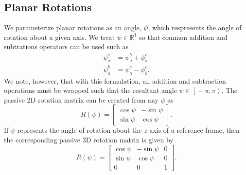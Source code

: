 
\subsection{Planar Rotations}

We parameterize planar rotations as an angle, $\psi$, which respresents
the angle of rotation about a given axis.
We treat $\psi \in \mathbb{R}^1$ so that common addition and subtrations
operators can be used such as
\begin{align}
  \psi_a^c &= \psi_a^b + \psi_b^c \\
  \psi_a^b &= \psi_a^c - \psi_b^c.
\end{align}
We note, however, that with this formulation, all addition and subtraction
operations must be wrapped such
that the resultant angle $\psi \in \left[ \right. -\pi, \pi \left. \right)$. The
passive 2D
rotation matrix can be created from any $\psi$ as
\begin{equation}
  R \left( \psi \right) = \begin{bmatrix} \cos \psi & -\sin \psi \\ \sin \psi &
  \cos \psi \end{bmatrix}.
\end{equation}
If $\psi$ represents the angle of rotation about the $z$ axis of a reference frame, then
the corresponding passive 3D rotation matrix is given by
\begin{equation}
  R \left( \psi \right) = \begin{bmatrix}
    \cos \psi & -\sin \psi & 0 \\
    \sin \psi & \cos \psi & 0 \\
    0 & 0 & 1
  \end{bmatrix}.
\end{equation}

